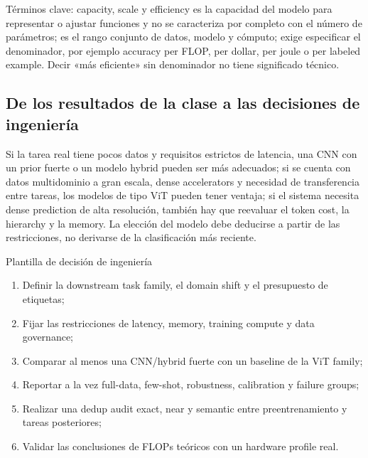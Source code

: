 \begin{knowledgebox}{Términos clave: capacity, scale y efficiency}
 es la capacidad del modelo para representar o ajustar funciones y no se caracteriza por completo con el número de parámetros;  es el rango conjunto de datos, modelo y cómputo;  exige especificar el denominador, por ejemplo accuracy per FLOP, per dollar, per joule o per labeled example. Decir «más eficiente» sin denominador no tiene significado técnico.
\end{knowledgebox}


\subsection{De los resultados de la clase a las decisiones de ingeniería}

Si la tarea real tiene pocos datos y requisitos estrictos de latencia, una CNN con un prior fuerte o un modelo hybrid pueden ser más adecuados; si se cuenta con datos multidominio a gran escala, dense accelerators y necesidad de transferencia entre tareas, los modelos de tipo ViT pueden tener ventaja; si el sistema necesita dense prediction de alta resolución, también hay que reevaluar el token cost, la hierarchy y la memory. La elección del modelo debe deducirse a partir de las restricciones, no derivarse de la clasificación más reciente.

\begin{importantbox}{Plantilla de decisión de ingeniería}
\begin{enumerate}
  \item Definir la downstream task family, el domain shift y el presupuesto de etiquetas;
  \item Fijar las restricciones de latency, memory, training compute y data governance;
  \item Comparar al menos una CNN/hybrid fuerte con un baseline de la ViT family;
  \item Reportar a la vez full-data, few-shot, robustness, calibration y failure groups;
  \item Realizar una dedup audit exact, near y semantic entre preentrenamiento y tareas posteriores;
  \item Validar las conclusiones de FLOPs teóricos con un hardware profile real.
\end{enumerate}
\end{importantbox}

